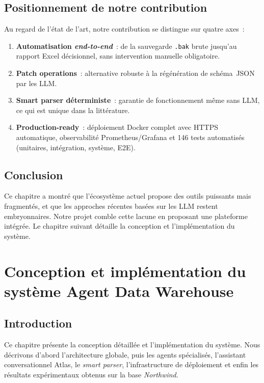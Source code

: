 \documentclass[12pt, a4paper]{report}
\begin{document}
\section{Positionnement de notre contribution}
Au regard de l'état de l'art, notre contribution se distingue sur
quatre axes~:
\begin{enumerate}
  \item \textbf{Automatisation \emph{end-to-end}}~: de la sauvegarde
        \texttt{.bak} brute jusqu'au rapport Excel décisionnel,
        sans intervention manuelle obligatoire.
  \item \textbf{Patch operations}~: alternative robuste à la
        régénération de schéma~JSON par les \ac{LLM}.
  \item \textbf{Smart parser déterministe}~: garantie de fonctionnement
        même sans \ac{LLM}, ce qui est unique dans la littérature.
  \item \textbf{Production-ready}~: déploiement Docker complet avec
        \ac{HTTPS} automatique, observabilité Prometheus/Grafana
        et 146 tests automatisés (unitaires, intégration, système,
        E2E).
\end{enumerate}

\section{Conclusion}
Ce chapitre a montré que l'écosystème actuel propose des outils puissants
mais fragmentés, et que les approches récentes basées sur les
\ac{LLM} restent embryonnaires. Notre projet comble cette lacune en
proposant une plateforme intégrée. Le chapitre suivant détaille la
conception et l'implémentation du système.

\cleardoublepage

\chapter{Conception et implémentation du système Agent Data Warehouse}
\label{chap:conception}

\section{Introduction}
Ce chapitre présente la conception détaillée et l'implémentation du
système. Nous décrivons d'abord l'architecture globale, puis les
agents spécialisés, l'assistant conversationnel Atlas, le \emph{smart
parser}, l'infrastructure de déploiement et enfin les résultats
expérimentaux obtenus sur la base \textit{Northwind}.
\end{document}
